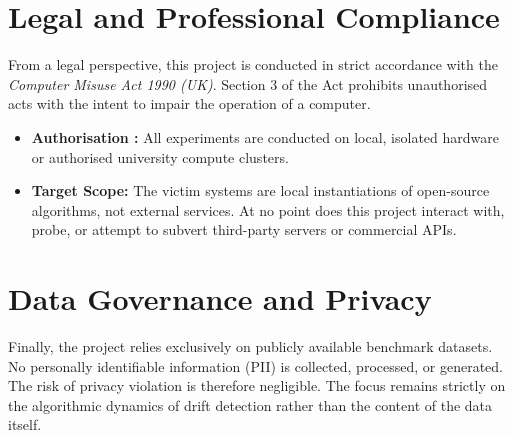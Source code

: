 \section{Legal and Professional Compliance}
From a legal perspective, this project is conducted in strict accordance with the \textit{Computer Misuse Act 1990 (UK)}. Section 3 of the Act prohibits unauthorised acts with the intent to impair the operation of a computer. 
\begin{itemize}
    \item \textbf{Authorisation :} All experiments are conducted on local, isolated hardware or authorised university compute clusters.
    \item \textbf{Target Scope:} The victim systems are local instantiations of open-source algorithms, not external services. At no point does this project interact with, probe, or attempt to subvert third-party servers or commercial APIs.
\end{itemize}

\section{Data Governance and Privacy}
Finally, the project relies exclusively on publicly available benchmark datasets. No personally identifiable information (PII) is collected, processed, or generated. The risk of privacy violation is therefore negligible. The focus remains strictly on the algorithmic dynamics of drift detection rather than the content of the data itself.